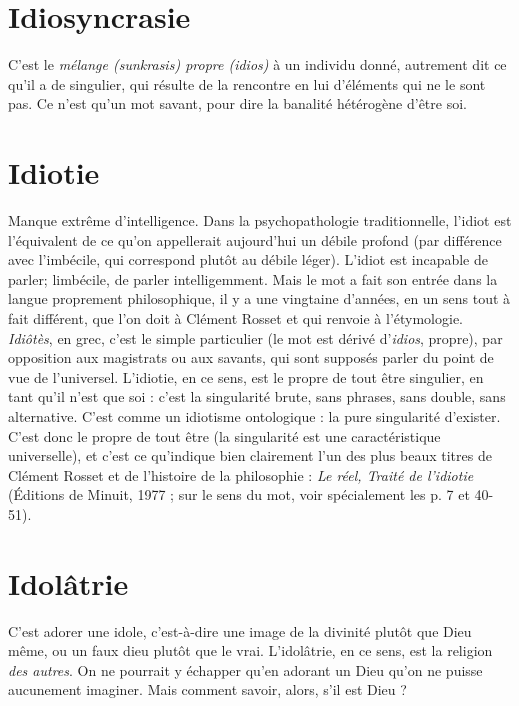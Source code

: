 \section{Idiosyncrasie}
C’est le {\it mélange (sunkrasis) propre (idios)} à un individu
donné, autrement dit ce qu’il a de singulier, qui résulte
de la rencontre en lui d'éléments qui ne le sont pas. Ce n’est qu’un mot savant,
pour dire la banalité hétérogène d’être soi.

\section{Idiotie}
Manque extrême d'intelligence. Dans la psychopathologie traditionnelle,
l’idiot est l'équivalent de ce qu’on appellerait aujourd’hui
un débile profond (par différence avec l’imbécile, qui correspond plutôt
au débile léger). L’idiot est incapable de parler; limbécile, de parler
intelligemment. Mais le mot a fait son entrée dans la langue proprement philosophique,
il y a une vingtaine d’années, en un sens tout à fait différent, que l’on
doit à Clément Rosset et qui renvoie à l’étymologie. {\it Idiôtès}, en grec, c’est le
simple particulier (le mot est dérivé d’{\it idios}, propre), par opposition aux magistrats
ou aux savants, qui sont supposés parler du point de vue de l’universel.
L’idiotie, en ce sens, est le propre de tout être singulier, en tant qu’il n’est que
soi : c’est la singularité brute, sans phrases, sans double, sans alternative. C’est
comme un idiotisme ontologique : la pure singularité d’exister. C’est donc le
propre de tout être (la singularité est une caractéristique universelle), et c’est ce
qu’indique bien clairement l’un des plus beaux titres de Clément Rosset et de
l’histoire de la philosophie : {\it Le réel, Traité de l'idiotie} (Éditions de Minuit,
1977 ; sur le sens du mot, voir spécialement les p. 7 et 40-51).

\section{Idolâtrie}
C’est adorer une idole, c’est-à-dire une image de la divinité
plutôt que Dieu même, ou un faux dieu plutôt que le vrai.
L'idolâtrie, en ce sens, est la religion {\it des autres}. On ne pourrait y échapper
qu’en adorant un Dieu qu’on ne puisse aucunement imaginer. Mais comment
savoir, alors, s’il est Dieu ?

